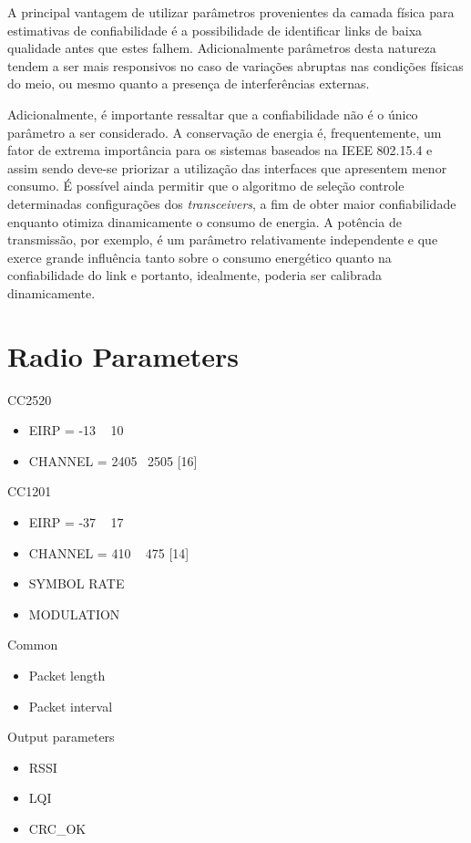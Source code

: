 \documentclass{article}
\begin{document}
	A principal vantagem de utilizar parâmetros provenientes da camada física para estimativas de confiabilidade é a possibilidade de identificar links de baixa qualidade antes que estes falhem. Adicionalmente parâmetros desta natureza tendem a ser mais responsivos no caso de variações abruptas nas condições físicas do meio, ou mesmo quanto a presença de interferências externas.

	Adicionalmente, é importante ressaltar que a confiabilidade não é o único parâmetro a ser considerado. A conservação de energia é, frequentemente, um fator de extrema importância para os sistemas baseados na IEEE 802.15.4 e assim sendo deve-se priorizar a utilização das interfaces que apresentem menor consumo. É possível ainda permitir que o algoritmo de seleção controle determinadas configurações dos \textit{transceivers}, a fim de obter maior confiabilidade enquanto otimiza dinamicamente o consumo de energia. A potência de transmissão, por exemplo, é um parâmetro relativamente independente e que exerce grande influência tanto sobre o consumo energético quanto na confiabilidade do link e portanto, idealmente, poderia ser calibrada dinamicamente.
\clearpage

\section{Radio Parameters}
CC2520
\begin{itemize}
	\item EIRP = -13 ~ 10
	\item CHANNEL = 2405 ~2505 [16]
\end{itemize}
CC1201
\begin{itemize}
	\item EIRP = -37 ~ 17
	\item CHANNEL = 410 ~ 475 [14]
	\item SYMBOL RATE
	\item MODULATION
\end{itemize}
Common
\begin{itemize}
	\item Packet length
	\item Packet interval
\end{itemize}
Output parameters
\begin{itemize}
	\item RSSI
	\item LQI
	\item CRC\_OK
\end{itemize}
\clearpage



\end{document}
